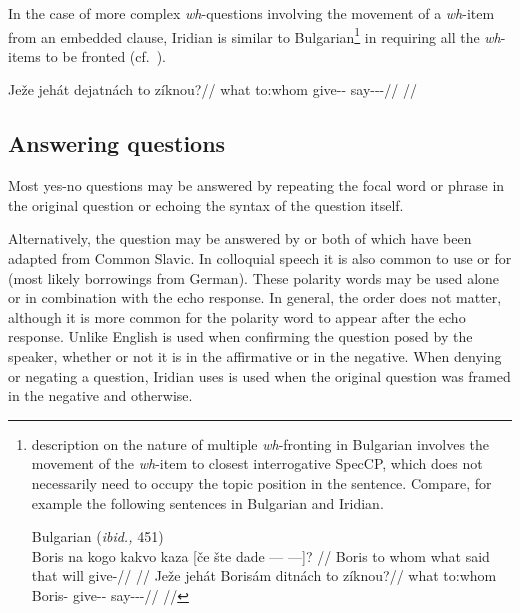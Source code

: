 In the case of more complex \emph{wh}-questions involving the movement of a
  \emph{wh}-item from an embedded clause, Iridian is similar to
  Bulgarian\footnote{  description on the nature of multiple
  \emph{wh}-fronting in Bulgarian involves the movement of the
  \emph{wh}-item to closest interrogative SpecCP, which does not necessarily
  need to occupy the topic position in the sentence. Compare, for example the
  following sentences in Bulgarian and Iridian.

  \ex[lingstyle=fnex,belowexskip=-1em,aboveglftskip=1pt]
  Bulgarian (\emph{ibid.,} 451)\smallskip\\
    \begingl 
    \gla Boris na kogo kakvo kaza [če šte {dade --- ---]}? //
    \glb Boris to whom what said that will give-\Third{}\Sg{}//
    \glft {}//
  \endgl
  \xe
\smallskip
  \ex[lingstyle=fnex,belowexskip=-1em,aboveglftskip=1pt]
    \begingl 
    \gla Ježe jehát Borisám ditnách to zíknou?//
    \glb what to:whom Boris-\Agt{} give-\Pv{}-\Ctp{} \Rz{} say-\Pv{}-\Pf{}-\Nz{}//
    \glft {}//
  \endgl
  \xe

} in requiring all the \emph{wh}-items to be fronted (cf.~\cite[450]{rudin1988}).

\pex
\begingl
\gla Ježe jehát dejatnách to zíknou?//
\glb what to:whom give-\Pv{}-\Ctp{} \Rz{} say-\Pv{}-\Pf{}-\Nz{}//
\glft {}//
\endgl
\xe


\subsection{Answering questions}\label{sec:ansyn}

Most yes-no questions may be answered by repeating the focal word or phrase in
the original question or echoing the syntax of the question itself.

\ex
{}
\xe

Alternatively, the question may be answered by  or 
both of which have been adapted from Common Slavic. In
colloquial speech it is also common to use  or  for 
(most likely borrowings from German). These polarity words may be
used alone or in combination with the echo response. In general, the order does
not matter, although it is more common for the polarity word to appear after the
echo response. Unlike English   is used when confirming the
question posed by the speaker, whether or not it is in the affirmative or in the
negative. When denying or negating a question, Iridian uses  is used
when the original question was framed in the negative and  otherwise.

